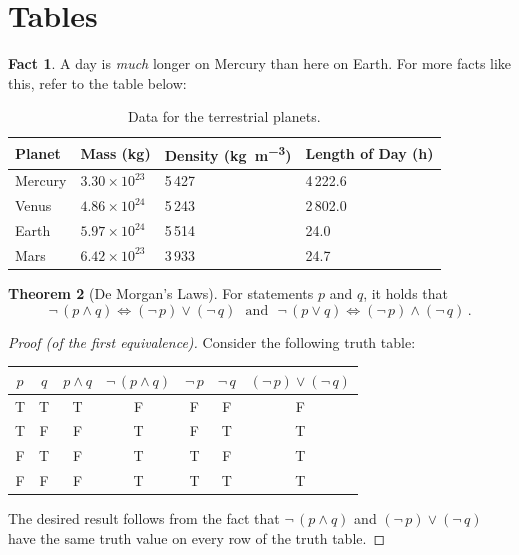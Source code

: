\documentclass[11pt,letterpaper,titlepage]{article}
\numberwithin{equation}{section}
\numberwithin{figure}{section}
\numberwithin{table}{section}
\numberwithin{algorithm}{section}
\theoremstyle{definition}
\newtheorem{theorem}{Theorem}[section] %
\newtheorem{fact}[theorem]{Fact} %
\begin{document}
\section{Tables}

\begin{fact}
    A day is \emph{much} longer on Mercury than here on Earth. For more facts like this, refer to the table below:
\end{fact}

\begin{table}[H]
    \centering
    \caption{Data for the terrestrial planets. \label{tbl:planets}}
    \begin{tabular}{llll}
        \toprule
        \textbf{Planet}     &\textbf{Mass (\si{\kilo\gram})}    & \textbf{Density (\si{\kilo\gram\per\meter\cubed})} & \textbf{Length of Day (\si{\hour})}\\
        \midrule
        Mercury & $3.30\times 10^{23}$  & 5\,427 & 4\,222.6\\
        Venus     & $4.86\times 10^{24}$ & 5\,243 & 2\,802.0    \\
        Earth    & $5.97\times 10^{24}$ & 5\,514 & 24.0 \\
        Mars    & $6.42\times 10^{23}$ & 3\,933 & 24.7\\
        \bottomrule
    \end{tabular}
\end{table}

\begin{theorem}[De Morgan's Laws]
    For statements $p$ and $q$, it holds that \[\neg\,(p\wedge q)\iff (\neg\, p)\vee (\neg\, q)\:\:\:\text{and}\:\:\:\neg\,(p\vee q)\iff (\neg\, p)\wedge (\neg\, q)\,.\]
\end{theorem}

\begin{proof}[Proof (of the first equivalence)]
    Consider the following truth table:
    \begin{center}
    \begin{tabular}{ccccccc}
        \toprule
        \textbf{$p$} & \textbf{$q$} & \textbf{$p\wedge q$} & \textbf{$\neg\,(p\wedge q)$} & \textbf{$\neg\, p$} & \textbf{$\neg\, q$} & \textbf{$(\neg\,p)\vee (\neg\, q)$} \\
        \midrule
        T & T & T & F & F & F & F\\
        T & F & F & T & F & T & T\\
        F & T & F & T & T & F & T\\
        F & F & F & T & T & T & T\\
        \bottomrule
    \end{tabular}
    \end{center}
    The desired result follows from the fact that $\neg\,(p\wedge q)$ and $(\neg\, p)\vee (\neg\, q)$ have the same truth value on every row of the truth table.
\end{proof}
\end{document}
